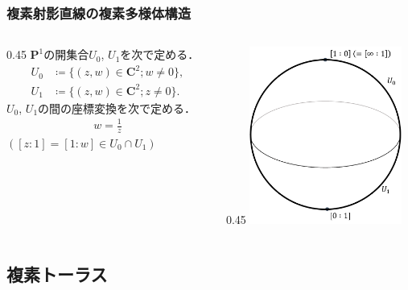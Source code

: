\documentclass[dvipdfmx,12pt,aspectratio=169]{beamer}%
\newcommand{\cc}{\mathbf{C}}
\newcommand{\pp}{\mathbf{P}}
\begin{document}
\begin{frame}
    \frametitle{複素射影直線の複素多様体構造}
    \begin{columns}
        \begin{column}{0.45\hsize}
            $\pp^1$の開集合$U_0$, $U_1$を次で定める．
            \begin{align*}
                U_0&\coloneqq\{(z,w)\in\cc^2; w\neq0\},\\
                U_1&\coloneqq\{(z,w)\in\cc^2; z\neq0\}.
            \end{align*}
            $U_0$, $U_1$の間の座標変換を次で定める．
            \begin{align*}
                w=\frac{1}{z}
            \end{align*}
            $([z:1]=[1:w]\in U_0\cap U_1)$
        \end{column}
        \begin{column}{0.45\hsize}
            \includegraphics[width=5cm]{fig/riemann-sphere.pdf}
            \centering
        \end{column}
    \end{columns}
\end{frame}
\subsection{複素トーラス}
\end{document}
